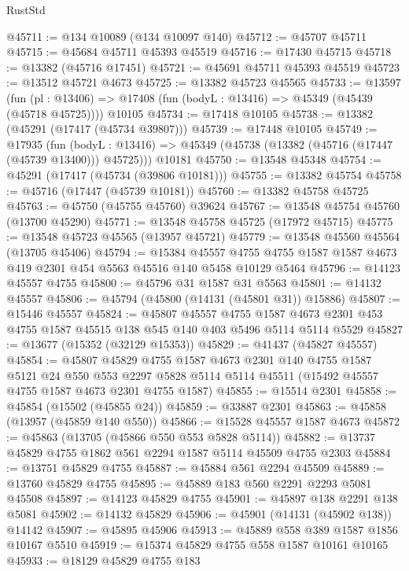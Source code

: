 \begin{lexlean}{RustStd}
\begin{coremodule}
@45711 := @134 @10089 (@134 @10097 @140)
@45712 := @45707 @45711
@45715 := @45684 @45711 @45393 @45519
@45716 := @17430 @45715
@45718 := @13382 (@45716 @17451)
@45721 := @45691 @45711 @45393 @45519
@45723 := @13512 @45721 @4673
@45725 := @13382 @45723 @45565
@45733 := @13597
    (fun (pl : @13406) => @17408 (fun (bodyL : @13416) => @45349 (@45439 (@45718 @45725))))
    @10105
@45734 := @17418 @10105
@45738 := @13382 (@45291 (@17417 (@45734 @39807)))
@45739 := @17448 @10105
@45749 := @17935
    (fun (bodyL : @13416) => @45349 (@45738 (@13382 (@45716 (@17447 (@45739 @13400))) @45725)))
    @10181
@45750 := @13548 @45348
@45754 := @45291 (@17417 (@45734 (@39806 @10181)))
@45755 := @13382 @45754
@45758 := @45716 (@17447 (@45739 @10181))
@45760 := @13382 @45758 @45725
@45763 := @45750 (@45755 @45760) @39624
@45767 := @13548 @45754 @45760 (@13700 @45290)
@45771 := @13548 @45758 @45725 (@17972 @45715)
@45775 := @13548 @45723 @45565 (@13957 @45721)
@45779 := @13548 @45560 @45564 (@13705 @45406)
@45794 := @15384
    @45557
    @4755
    @4755
    @1587
    @1587
    @4673
    @419
    @2301
    @454
    @5563
    @45516
    @140
    @5458
    @10129
    @5464
@45796 := @14123 @45557 @4755
@45800 := @45796 @31 @1587 @31 @5563
@45801 := @14132 @45557
@45806 := @45794 (@45800 (@14131 (@45801 @31)) @15886)
@45807 := @15446 @45557
@45824 := @45807
    @45557
    @4755
    @1587
    @4673
    @2301
    @453
    @4755
    @1587
    @45515
    @138
    @545
    @140
    @403
    @5496
    @5114
    @5114
    @5529
@45827 := @13677 (@15352 (@32129 @15353))
@45829 := @41437 (@45827 @45557)
@45854 := @45807
    @45829
    @4755
    @1587
    @4673
    @2301
    @140
    @4755
    @1587
    @5121
    @24
    @550
    @553
    @2297
    @5828
    @5114
    @5114
    @45511
    (@15492 @45557 @4755 @1587 @4673 @2301 @4755 @1587)
@45855 := @15514 @2301
@45858 := @45854 (@15502 (@45855 @24))
@45859 := @33887 @2301
@45863 := @45858 (@13957 (@45859 @140 @550))
@45866 := @15528 @45557 @1587 @4673
@45872 := @45863 (@13705 (@45866 @550 @553 @5828 @5114))
@45882 := @13737 @45829 @4755 @1862 @561 @2294 @1587 @5114 @45509 @4755 @2303
@45884 := @13751 @45829 @4755
@45887 := @45884 @561 @2294 @45509
@45889 := @13760 @45829 @4755
@45895 := @45889 @183 @560 @2291 @2293 @5081 @45508
@45897 := @14123 @45829 @4755
@45901 := @45897 @138 @2291 @138 @5081
@45902 := @14132 @45829
@45906 := @45901 (@14131 (@45902 @138)) @14142
@45907 := @45895 @45906
@45913 := @45889 @558 @389 @1587 @1856 @10167 @5510
@45919 := @15374 @45829 @4755 @558 @1587 @10161 @10165
@45933 := @18129
    @45829
    @4755
    @183

\end{coremodule}
\end{lexlean}
